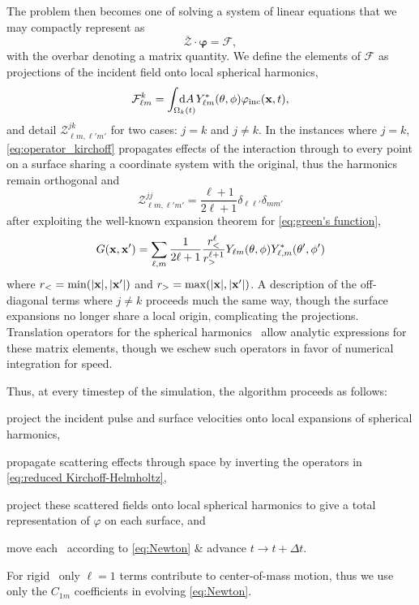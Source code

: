 The problem then becomes one of solving a system of linear equations that we may compactly represent as
\begin{equation}
  \overline{\boldsymbol{\mathcal{Z}}} \cdot \boldsymbol{\varphi} = \boldsymbol{\mathcal{F}},
  \label{eq:z_matrix_system}
\end{equation}
with the overbar denoting a matrix quantity.
We define the elements of $\boldsymbol{\mathcal{F}}$ as projections of the incident field onto local spherical harmonics,
\begin{equation}
  \mathcal{F}_{\ell m}^k = \int_{\Omega_k(t)} \mkern-30mu \dd{A} Y^*_{\ell m}(\theta, \phi) \varphi_\text{inc}(\vb{x}, t),
  \label{eq:forcing projection}
\end{equation}
and detail $\mathcal{Z}^{jk}_{\ell m, \ell' m'}$ for two cases: $j = k$ and $j \not = k$.
In the instances where $j = k$, \cref{eq:operator_kirchoff} propagates effects of the interaction through to every point on a surface sharing a coordinate system with the original, thus the harmonics remain orthogonal and
\begin{equation}
  \mathcal{Z}_{\ell m, \ell' m'}^{jj} = \frac{\ell + 1}{2\ell + 1}  \delta_{\ell \ell'} \delta_{m m'}
  \label{eq:z_matrix_self}
\end{equation}
after exploiting the well-known expansion theorem for \cref{eq:green's function},
\begin{equation}
  G(\vb{x}, \vb{x}') = \sum_{\ell, m}\frac{1}{2\ell + 1}\frac{r_<^\ell}{r_>^{\ell + 1}}Y_{\ell m}\qty(\theta, \phi)Y^*_{\ell, m}\qty(\theta', \phi')
  \label{eq:expansion theorem}
\end{equation}
where $r_< = \mathrm{min}\qty(\abs{\vb{x}},\abs{\vb{x}'})$ and $r_> = \mathrm{max}\qty(\abs{\vb{x}}, \abs{\vb{x}'})$.
A description of the off-diagonal terms where $j \not = k$ proceeds much the same way, though the surface expansions no longer share a local origin, complicating the projections.
Translation operators for the spherical harmonics~\cite{Caola1978,Greengard1987} allow analytic expressions for these matrix elements, though we eschew such operators in favor of numerical integration for speed.

Thus, at every timestep of the simulation, the algorithm proceeds as follows:
\begin{inparaenum}[(i)]
  \item project the incident pulse and surface velocities onto local expansions of spherical harmonics,
  \item propagate scattering effects through space by inverting the operators in \cref{eq:reduced Kirchoff-Helmholtz},
  \item project these scattered fields onto local spherical harmonics to give a total representation of $\varphi$ on each surface, and
  \item move each \bubble\ according to \cref{eq:Newton} \& advance $t \rightarrow t + \Delta t$.
\end{inparaenum}
For rigid \bubbles\ only $\ell = 1$ terms contribute to center-of-mass motion, thus we use only the $C_{1m}$ coefficients in evolving \cref{eq:Newton}.

